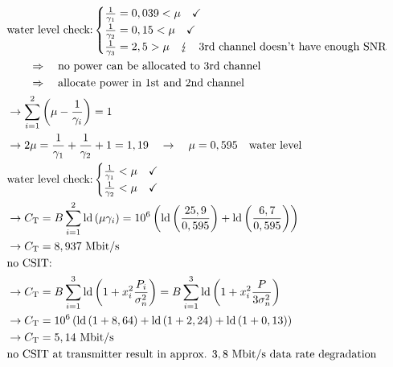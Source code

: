\begin{align*}
	&\text{water level check:}
	\begin{cases}
	\frac{1}{\gamma_{1}}=0,039<\mu\quad\checkmark \\
	\frac{1}{\gamma_{2}}=0,15<\mu\quad\checkmark \\
	\frac{1}{\gamma_{3}}=2,5>\mu \quad\lightning\quad\text{3rd channel doesn't have enough SNR}
	\end{cases}& \\
	&\qquad\Rightarrow\quad\text{no power can be allocated to 3rd channel}& \\
	&\qquad\Rightarrow\quad\text{allocate power in 1st and 2nd channel}& \\
	&\rightarrow\sum_{i=1}^{2}\left(\mu-\frac{1}{\gamma_{i}}\right)=1& \\
	&\rightarrow 2\mu=\frac{1}{\gamma_{1}}+\frac{1}{\gamma_{2}}+1=1,19\quad\rightarrow\quad\mu=0,595\quad\text{water level}& \\
	&\text{water level check:}
	\begin{cases}
	\frac{1}{\gamma_{1}}<\mu\quad\checkmark \\
	\frac{1}{\gamma_{2}}<\mu\quad\checkmark \\
	\end{cases}& \\
	&\rightarrow C_{\mathrm{T}}=B\sum_{i=1}^{2}\operatorname{ld}\left(\mu\gamma_{i}\right)=10^{6}\left(\operatorname{ld}\left(\frac{25,9}{0,595}\right)+\operatorname{ld}\left(\frac{6,7}{0,595}\right)\right)& \\
	&\rightarrow C_{\mathrm{T}}=8,937\text{ Mbit/s}& \\
	&\text{no CSIT: }& \\
	&\rightarrow C_{\mathrm{T}}=B\sum_{i=1}^{3}\operatorname{ld}\left(1+x_{i}^{2}\frac{P_{i}}{\sigma_{n}^{2}}\right)=B\sum_{i=1}^{3}\operatorname{ld}\left(1+x_{i}^{2}\frac{P}{3\sigma_{n}^{2}}\right)& \\
	&\rightarrow C_{\mathrm{T}}=10^{6}\left(\operatorname{ld}\left(1+8,64\right)+\operatorname{ld}\left(1+2,24\right)+\operatorname{ld}\left(1+0,13\right)\right)& \\
	&\rightarrow C_{\mathrm{T}}=5,14\text{ Mbit/s}& \\
	&\text{no CSIT at transmitter result in approx. $3,8$ Mbit/s data rate degradation}&
\end{align*}